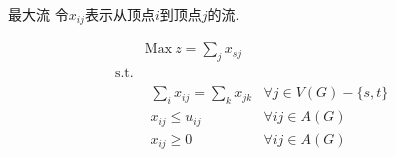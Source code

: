 \documentclass[UTF8]{ctexbeamer}
\begin{document}
\begin{frame}{最大流}
  令$x_{ij}$表示从顶点$i$到顶点$j$的流.

  \[
  \begin{array}{lcl}
    & \mbox{Max}\ z = \sum_{j} x_{sj} & \\
    \mbox{s.t.} & &  \\
    &
    \begin{array}{cc}
      \sum_i x_{ij} = \sum_k x_{jk} & \forall j \in V(G)-\{s, t\}\\
      x_{ij} \le u_{ij} & \forall ij \in A(G)\\
      x_{ij} \ge 0 & \forall ij \in A(G)
    \end{array}
    &
  \end{array}
  \]

\end{frame}
\end{document}

